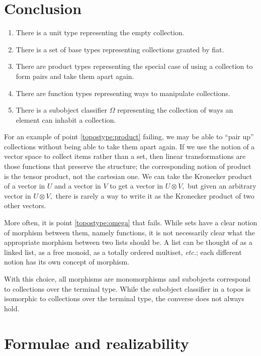 \documentclass[sigplan,9pt,review,anonymous]{acmart}\settopmatter{printfolios=true,printccs=false,printacmref=false}
\begin{document}
\section{Conclusion}

\begin{enumerate}
  \item \label{topostype:unit} There is a unit type representing the empty collection.
  \item \label{topostype:base} There is a set of base types representing collections granted by fiat.
  \item \label{topostype:product} There are product types representing the special case of using a collection to form pairs and take them apart again.
  \item \label{topostype:function} There are function types representing ways to manipulate collections.
  \item \label{topostype:omega} There is a subobject classifier $\Omega$ representing the collection of ways an element can inhabit a collection.
\end{enumerate}

For an example of point \ref{topostype:product} failing, we may be able to ``pair up'' collections without being able to take them apart again.  If we use the notion of a vector space to collect items rather than a set, then linear transformations are those functions that preserve the structure; the corresponding notion of product is the tensor product, not the cartesian one.  We can take the Kronecker product of a vector in $U$ and a vector in $V$ to get a vector in $U \otimes V,$ but given an arbitrary vector in $U\otimes V,$ there is rarely a way to write it as the Kronecker product of two other vectors.  

More often, it is point \ref{topostype:omega} that fails.  While sets have a clear notion of morphism between them, namely functions, it is not necessarily clear what the appropriate morphism between two lists should be.  A list can be thought of as a linked list, as a free monoid, as a totally ordered multiset, {\em etc.}; each different notion has its own concept of morphism.

  

With this choice, all morphisms are monomorphisms and subobjects correspond to collections over the terminal type.  While the subobject classifier in a topos is isomorphic to collections over the terminal type, the converse does not always hold.

\section{Formulae and realizability}
\end{document}
